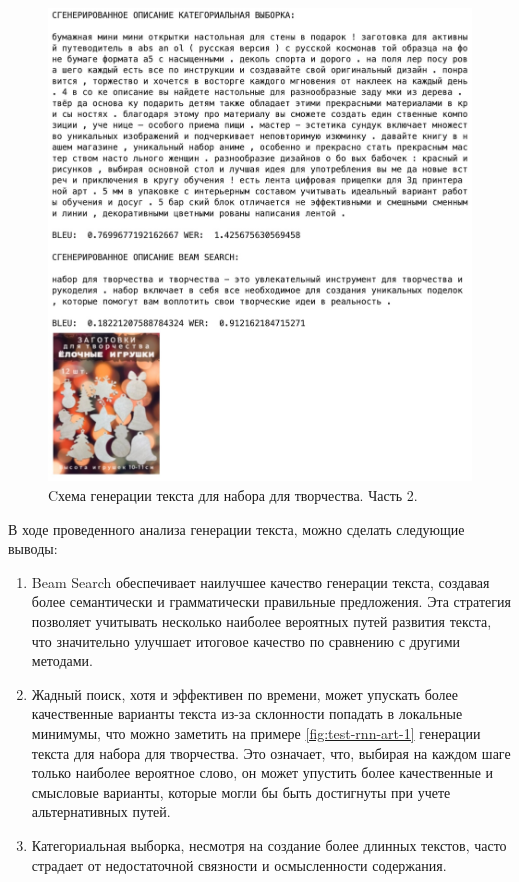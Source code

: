 \documentclass[a4paper,12pt]{extarticle}
\begin{document}
\newpage
\begin{figure}[ht]
	\centering
	\includegraphics[scale=0.4]{test-rnn-art-2.png}
	\caption{Cхема генерации текста для набора для творчества. Часть 2.}
	\label{fig:test-rnn-art-2}
\end{figure}

В ходе проведенного анализа генерации текста, можно сделать следующие выводы:
\begin{enumerate}[label=\arabic*.]
	\item Beam Search обеспечивает наилучшее качество генерации текста, создавая более семантически и грамматически правильные предложения. Эта стратегия позволяет учитывать несколько наиболее вероятных путей развития текста, что значительно улучшает итоговое качество по сравнению с другими методами.
	\item Жадный поиск, хотя и эффективен по времени, может упускать более качественные варианты текста из-за склонности попадать в локальные минимумы, что можно заметить на примере \ref{fig:test-rnn-art-1} генерации текста для набора для творчества. Это означает, что, выбирая на каждом шаге только наиболее вероятное слово, он может упустить более качественные и смысловые варианты, которые могли бы быть достигнуты при учете альтернативных путей.
	\item Категориальная выборка, несмотря на создание более длинных текстов, часто страдает от недостаточной связности и осмысленности содержания.
\end{enumerate}
\end{document}
